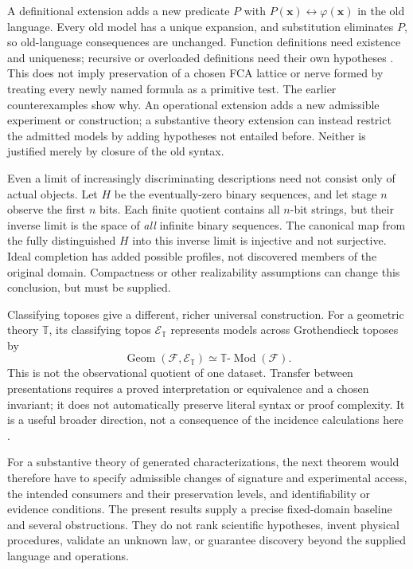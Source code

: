 \documentclass[11pt]{article}
\theoremstyle{definition}
\begin{document}
A definitional extension adds a new predicate $P$ with
$P(\mathbf x)\leftrightarrow\varphi(\mathbf x)$ in the old language.
Every old model has a unique expansion, and substitution eliminates $P$,
so old-language consequences are unchanged. Function definitions need
existence and uniqueness; recursive or overloaded definitions need their
own hypotheses \cite{Xue,GengelbachWeber}. This does not imply preservation
of a chosen FCA lattice or nerve formed by treating every newly named
formula as a primitive test. The earlier counterexamples show why.
An operational extension adds a new admissible experiment or construction;
a substantive theory extension can instead restrict the admitted models
by adding hypotheses not entailed before. Neither is justified merely by
closure of the old syntax.

Even a limit of increasingly discriminating descriptions need not consist
only of actual objects. Let $H$ be the eventually-zero binary sequences,
and let stage $n$ observe the first $n$ bits. Each finite quotient contains
all $n$-bit strings, but their inverse limit is the space of \emph{all}
infinite binary sequences. The canonical map from the fully distinguished
$H$ into this inverse limit is injective and not surjective. Ideal completion
has added possible profiles, not discovered members of the original domain.
Compactness or other realizability assumptions can change this conclusion,
but must be supplied.

Classifying toposes give a different, richer universal construction. For a
geometric theory $\mathbb T$, its classifying topos $\mathcal E_{\mathbb T}$
represents models across Grothendieck toposes by
\[
 \operatorname{Geom}(\mathcal F,\mathcal E_{\mathbb T})
 \simeq \mathbb T\text{-}\operatorname{Mod}(\mathcal F).
\]
This is not the observational quotient of one dataset. Transfer between
presentations requires a proved interpretation or equivalence and a chosen
invariant; it does not automatically preserve literal syntax or proof
complexity. It is a useful broader direction, not a consequence of the
incidence calculations here \cite{Caramello}.

For a substantive theory of generated characterizations, the next theorem
would therefore have to specify admissible changes of signature and
experimental access, the intended consumers and their preservation levels,
and identifiability or evidence conditions. The present results supply a
precise fixed-domain baseline and several obstructions. They do not rank
scientific hypotheses, invent physical procedures, validate an unknown
law, or guarantee discovery beyond the supplied language and operations.
\end{document}
